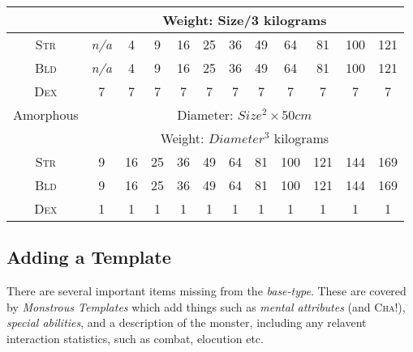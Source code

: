 \begin{tabular}[htb]{c|c|c|c|c|c|c|c|c|c|c|c}
& \multicolumn{11}{c}{Weight: Size/3 kilograms} \\
\hline
\textsc{Str} & \emph{n/a} & 4 & 9 & 16 & 25 & 36 & 49 & 64 & 81 & 100 & 121 \\
\textsc{Bld} & \emph{n/a} & 4 & 9 & 16 & 25 & 36 & 49 & 64 & 81 & 100 & 121 \\
\textsc{Dex} & 7 & 7 & 7 & 7 & 7 & 7 & 7 & 7 & 7 & 7 & 7 \\
\hline
Amorphous & \multicolumn{11}{c}{Diameter: $Size^2\times 50 cm$} \\
& \multicolumn{11}{c}{Weight: $Diameter^3$ kilograms} \\
\hline
\textsc{Str} & 9 & 16 & 25 & 36 & 49 & 64 & 81 & 100 & 121 & 144 & 169 \\
\textsc{Bld} & 9 & 16 & 25 & 36 & 49 & 64 & 81 & 100 & 121 & 144 & 169 \\
\textsc{Dex} & 1 & 1 & 1 & 1 & 1 & 1 & 1 & 1 & 1 & 1 & 1 \\
\end{tabular}

\subsection{Adding a Template}

There are several important items missing from the
\emph{base-type}. These are covered by \emph{Monstrous Templates}
which add things such as \emph{mental attributes} (and \textsc{Cha}!),
\emph{special abilities}, and a description of the monster, including
any relavent interaction statistics, such as combat, elocution etc.
